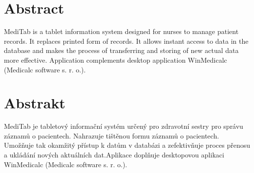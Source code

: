 \section*{Abstract}
MediTab is a tablet information system designed for nurses to manage patient records. It replaces printed form of records. It allows instant access to data in the database and makes the process of transferring and storing of new actual data more effective. Application complements desktop application WinMedicalc (Medicalc software s. r. o.).

\vfill

\section*{Abstrakt}
MediTab je tabletový informační systém určený pro zdravotní sestry pro správu záznamů o pacientech. Nahrazuje tištěnou formu záznamů o pacientech. Umožňuje tak okamžitý přístup k datům v databázi a zefektivňuje proces přenosu a ukládání nových aktuálních dat.Aplikace doplňuje desktopovou aplikaci WinMedicalc (Medicalc software s. r. o.).

\vfill